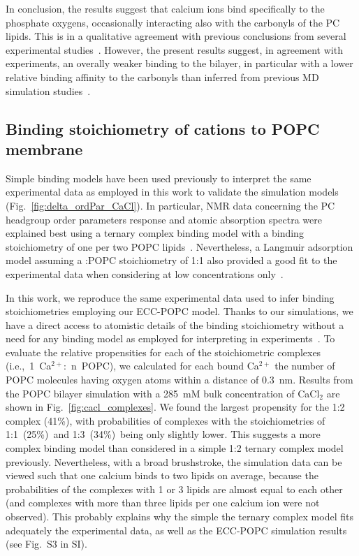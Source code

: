  
In conclusion, the results suggest that calcium ions bind specifically to the phosphate oxygens, occasionally interacting also with the carbonyls of the PC lipids. This is in a qualitative agreement with previous conclusions from several experimental studies~\citep{hauser76, hauser78, herbette84, cevc90, binder02}. However, the present results suggest, in 
agreement with experiments, an overally weaker binding to the bilayer, in particular with a lower relative binding affinity to the carbonyls than inferred from previous MD simulation studies~\citep{bockmann03, bockmann04, melcrova16, javanainen17}. 

 
\subsection{Binding stoichiometry of  cations to POPC membrane} 
Simple binding models have been used previously to interpret the same experimental data \citep{altenbach84,macdonald87} as employed in this work to validate the simulation models (Fig.~\ref{fig:delta_ordPar_CaCl}). In particular, NMR data concerning the PC headgroup order parameters response and atomic absorption spectra were explained best using a ternary complex binding model with a binding stoichiometry of one  per two POPC lipids~\citep{altenbach84}. Nevertheless, a Langmuir adsorption model assuming a :POPC stoichiometry of 1:1 also provided a good fit to the experimental data when considering  at low concentrations only~\citep{macdonald87}. 
 
 
In this work, we reproduce the same experimental data used to infer binding stoichiometries employing our ECC-POPC model. Thanks to our simulations, we have a direct access to atomistic details of the binding stoichiometry without a need for any binding model as employed for interpreting in experiments~\citep{altenbach84, macdonald87}.
To evaluate the relative propensities for each of the stoichiometric complexes (i.e.,~1~Ca$^{2+}$:~n~POPC),
we calculated for each bound Ca$^{2+}$ the number of POPC molecules having oxygen atoms within a distance of 0.3~nm.
Results from the POPC bilayer simulation with a 285~mM bulk concentration of CaCl$_2$ are shown in Fig.~\ref{fig:cacl_complexes}. 
We found the largest propensity for the 1:2 complex (41\%), with probabilities of complexes with the stoichiometries of 1:1~(25\%)~and 1:3~(34\%)~being only slightly lower. This suggests a more complex binding model than considered in a simple 1:2 ternary complex model previously. Nevertheless, with a broad brushstroke, the simulation data can be viewed such that one calcium binds to two lipids on average, because the probabilities of the complexes with 1 or 3 lipids are almost equal to each other  (and complexes with more than three lipids per one calcium ion were not observed). This probably explains why the simple the ternary complex model fits adequately the experimental data, as well as the ECC-POPC simulation results (see Fig.~S3 in SI). 
 
